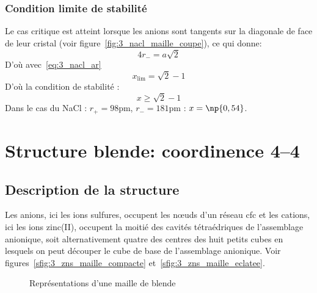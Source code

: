 \subsubsection{Condition limite de stabilité}
Le cas critique est atteint lorsque les anions sont tangents sur la diagonale de face
de leur cristal (voir figure~\ref{fig:3_nacl_maille_coupe}), ce qui donne:
\begin{equation}
    4r_- = a\sqrt{2}
    \label{eq:3_limite_ar-}
\end{equation}
D'où avec~\ref{eq:3_nacl_ar}
\begin{equation}
    x_\text{lim} = \sqrt{2} - 1
\end{equation}
D'où la condition de stabilité :
\begin{equation}
    \boxed{x \geq \sqrt{2} - 1}
    \label{eq:3_stab_x}
\end{equation}
Dans le cas du NaCl : $r_+ = 98$pm, $r_- = 181$pm : $x = \np{0,54}$.


\section{Structure blende: coordinence 4\---4}
\subsection{Description de la structure}
Les anions, ici les ions sulfures, occupent les n\oe uds d'un réseau cfc et les cations,
ici les ions zinc(II), occupent la moitié des cavités tétraédriques de l’assemblage
anionique, soit alternativement quatre des centres des huit petits cubes en lesquels on peut
découper le cube de base de l’assemblage anionique. Voir figures~\ref{sfig:3_zns_maille_compacte}
et~\ref{sfig:3_zns_maille_eclatee}.
\begin{figure}
    \centering
    \qquad
    \qquad
    \caption{Représentations d'une maille de blende}\label{fig:3_zns}
\end{figure}


